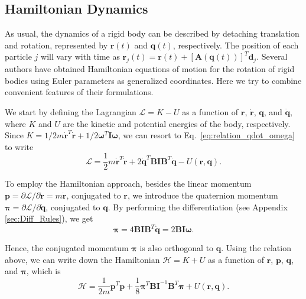 \documentclass[aip,jcp,reprint,amsmath,amssymb]{revtex4-1}
\newcommand{\mt}[1]{\boldsymbol{\mathbf{#1}}}           %
\newcommand{\vt}[1]{\boldsymbol{\mathbf{#1}}}           %
\newcommand{\tr}[1]{#1^T}                               %
\begin{document}
\subsection{Hamiltonian Dynamics}
\label{sec:hamiltonian}
As usual, the dynamics of a rigid body can be described by detaching translation and rotation, represented by ${\vt r}(t)$ and ${\vt q}(t)$, respectively. The position of each particle $j$ will vary with time as $\vt r_j(t) = \vt r(t) + \tr{[{\mt A}(\vt q(t))]}\vt d_j$. Several authors have obtained Hamiltonian equations of motion for the rotation of rigid bodies using Euler parameters as generalized coordinates.\cite{Maciejewski1985, Dichmann1996, Miller2002, Ravishankar2004, Nielsen2012} Here we try to combine convenient features of their formulations.

We start by defining the Lagrangian $\mathcal{L} = K - U$ as a function of $\vt r$, $\dot{\vt r}$, $\vt q$, and $\dot{\vt q}$, where $K$ and $U$ are the kinetic and potential energies of the body, respectively. Since $K = 1/2 m \tr{\dot{\vt r}} \dot{\vt r} + 1/2 \tr{\vt \omega} \mt I \vt \omega$,\cite{Goldstein2002} we can resort to Eq.~\ref{eq:relation_qdot_omega} to write
\[
\mathcal{L} = \frac{1}{2} m \tr{\dot{\vt r}} \dot{\vt r} + 2 \tr{\dot{\vt q}} \mt B \mt I \tr{\mt B} \dot{\vt q} - U(\vt r, \vt q).
\]

To employ the Hamiltonian approach, besides the linear momentum $\vt p = \partial \mathcal{L}/\partial \dot{\vt r} = m \dot{\vt r}$, conjugated to $\vt r$, we introduce the quaternion momentum $\vt \pi = \partial \mathcal{L}/\partial \dot{\vt q}$, conjugated to $\vt q$.\citep{Goldstein2002} By performing the differentiation (see Appendix \ref{sec:Diff_Rules}), we get
\begin{equation}
\label{eq:conj_momentum}
\vt \pi = 4 \mt B \mt I \tr{\mt B} \dot{\vt q} = 2 \mt B \mt I \vt \omega.
\end{equation}

Hence, the conjugated momentum $\vt \pi$ is also orthogonal to $\vt q$. Using the relation above, we can write down the Hamiltonian $\mathcal{H} = K + U$ as a function of $\vt r$, $\vt p$, $\vt q$, and $\vt \pi$, which is
\begin{equation}
\label{eq:H_with_B}
\mathcal{H} = \frac{1}{2m} \tr{\vt p} \vt p + \frac{1}{8} \tr{\vt \pi} {\mt B} {\mt I}^{-1} \tr{\mt B} \vt \pi + U(\vt r, \vt q).
\end{equation}
\end{document}
